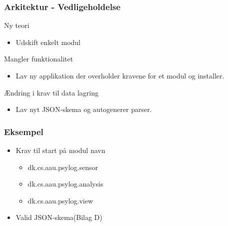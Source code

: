 \begin{frame}
\frametitle{Arkitektur - Vedligeholdelse}
Ny teori
\begin{itemize}
\item Udskift enkelt modul
\end{itemize}
Mangler funktionalitet
\begin{itemize}
\item Lav ny applikation der overholder kravene for et modul og installer.
\end{itemize}
Ændring i krav til data lagring
\begin{itemize}
\item Lav nyt JSON-skema og autogenerer parser.
\end{itemize}

\end{frame}

\begin{frame}
\frametitle{Eksempel}
\begin{itemize}
\item Krav til start på modul navn
\begin{itemize}
\item dk.cs.aau.psylog.sensor
\item dk.cs.aau.psylog.analysis
\item dk.cs.aau.psylog.view
\end{itemize}
\item Valid JSON-skema(Bilag D)
\end{itemize}
\end{frame}

